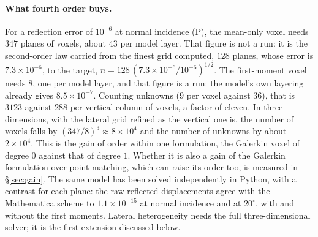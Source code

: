 \documentclass[11pt,a4paper]{article}
\begin{document}
\paragraph{What fourth order buys.} For a reflection error of $10^{-6}$ at normal incidence (P), the
mean-only voxel needs $347$ planes of voxels, about $43$ per model layer. That figure is not a run: it
is the second-order law carried from the finest grid computed, $128$ planes, whose error is
$7.3\times10^{-6}$, to the target, $n=128\,(7.3\times10^{-6}/10^{-6})^{1/2}$. The first-moment voxel needs
$8$, one per model layer, and that figure is a run: the model's own layering already gives
$8.5\times10^{-7}$. Counting
unknowns ($9$ per voxel against $36$), that is $3123$ against $288$ per vertical column of voxels, a
factor of eleven. In three dimensions, with the lateral grid refined as the vertical one is, the
number of voxels falls by $(347/8)^3\approx8\times10^4$ and the number of unknowns by about $2\times10^4$.
This is the gain of order within one formulation, the Galerkin voxel of degree $0$ against that of degree
$1$. Whether it is also a gain of the Galerkin formulation over point matching, which can raise its order
too, is measured in \S\ref{sec:gain}. The same model has been solved independently in Python, with a contrast for each plane: the raw
reflected displacements agree with the Mathematica scheme to $1.1\times10^{-15}$ at normal incidence
and at $20^\circ$, with and without the first moments. Lateral
heterogeneity needs the full three-dimensional solver; it is the first extension discussed below.
\end{document}
